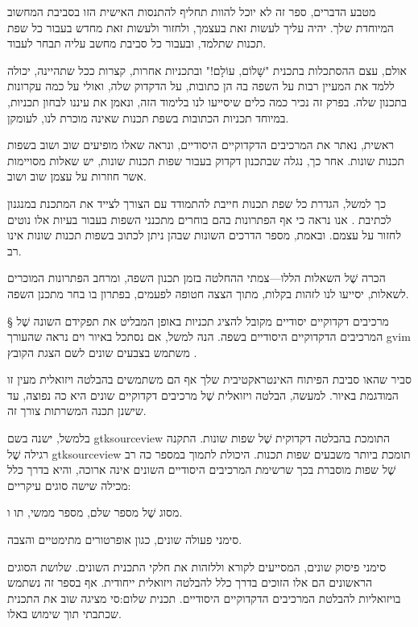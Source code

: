 מטבע הדברים, ספר זה לא יוכל להוות תחליף להתנסות האישית הזו בסביבת המחשוב
המיוחדת שלך. יהיה עליך לעשות זאת בעצמך, ולחזור ולעשות זאת מחדש בעבור כל שפת
תכנות שתלמד, ובעבור כל סביבת מחשב עליה תבחר לעבוד.

אולם, עצם ההסתכלות בתכנית "שָׁלוֹם, עוֹלָם!" ובתכניות אחרות, קצרות ככל שתהיינה,
יכולה ללמד את המעיין רבות על השפה בה הן כתובות, על הדקדוק שלה, ואולי על כמה
עקרונות בתכנון שלה. בפרק זה נכיר כמה כלים שיסייעו לנו בלימוד הזה, ונאמן את
עיננו לבחון תכניות, במיוחד תכניות הכתובות בשפת תכנות שאינה מוכרת לנו, לעומקן.

ראשית, נאתר את המרכיבים הדקדוקיים היסודיים, ונראה שאלו מופיעים שוב ושוב בשפות
תכנות שונות. אחר כך, נגלה שבתכנון דקדוק בעבור שפות תכנות שונות, יש שאלות
מסויימות אשר חוזרות על עצמן שוב ושוב.

כך למשל, הגדרת כל שפת תכנות חייבת להתמודד עם הצורך לצייד את המתכנת במנגנון
לכתיבת . אנו נראה כי אף הפתרונות בהם בוחרים מתכנני השפות בעבור בעיות אלו
נוטים לחזור על עצמם. ובאמת, מספר הדרכים השונות שבהן ניתן לכתוב  בשפות
תכנות שונות אינו רב.

הכרה שֶׁל השאלות הללו---צמתי ההחלטה בזמן תכנון השפה, ומרחב הפתרונות המוכרים
לשאלות, יסייעו לנו לזהות בקלות, מתוך הצצה חטופה לפעמים, בפתרון בו בחר מתכנן
השפה.

§ מרכיבים דקדוקיים יסודיים
מקובל להציג תכניות באופן המבליט את תפקידם השונה שֶׁל המרכיבים הדקדוקיים היסודיים
בשפה. הנה למשל, אם נסתכל ב איור וים נראה שהעורך gvim משתמש בצבעים שונים לשם
הצגת הקובץ .

סביר שה או סביבת הפיתוח האינטראקטיבית שלך אף הם משתמשים בהבלטה ויזואלית
מעין זו המודגמת באיור. למעשה, הבלטה ויזואלית שֶׁל מרכיבים דקדוקיים שונים היא כה
נפוצה, עד שישנן  תכנה המשרתות צורך זה.

ב למשל, ישנה  בשם gtksourceview התומכת בהבלטה דקדוקית שֶׁל שפות
שונות. התקנה רגילה שֶׁל gtksourceview תומכת ביותר משבעים שפות תכנות. היכולת
לתמוך במספר כה רב שֶׁל שפות מוסברת בכך שרשימת המרכיבים היסודיים השונים אינה
ארוכה, והיא בדרך כלל מכילה שישה סוגים עיקריים:
\item {} מסוג שֶׁל מספר שלם, מספר ממשי, תו ו.
\item {}
\item {}
\item {}
\item סימני פעולה שונים, כגון אופרטורים מתימטיים והצבה.
\item סימני פיסוק שונים, המסייעים לקורא ול לזהות את חלקי התכנית השונים.
שלושת הסוגים הראשונים הם אלו הזוכים בדרך כלל להבלטה ויזואלית ייחודית. אף בספר
זה נשתמש ב ויזואליות להבלטת המרכיבים הדקדוקיים היסודיים.  תכנית
שלום:סי מציגה שוב את התכנית  שכתבתי תוך שימוש ב אלו.

